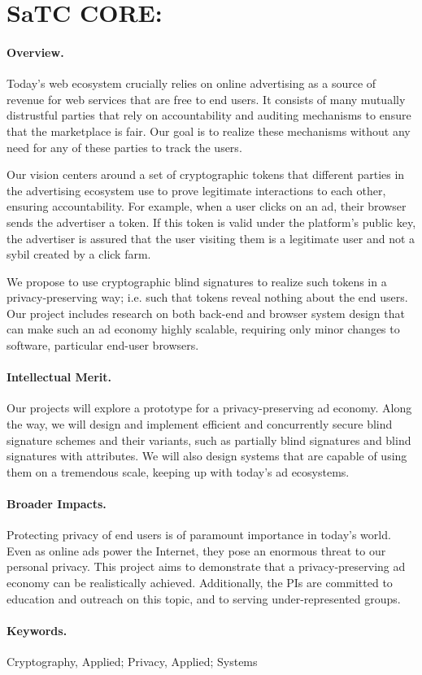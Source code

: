 \section*{SaTC CORE: \proptitle{}}
\label{sec:summary}

\paragraph{Overview.}
%
Today’s web ecosystem crucially relies on online advertising as a source of revenue for web services that are free to end users.  It consists of many mutually distrustful parties that rely on accountability and auditing mechanisms to ensure that the marketplace is fair.  Our goal is to realize these mechanisms without any need for any of these parties to track the users. 

Our vision centers around a set of cryptographic tokens that different parties in the advertising ecosystem use to prove legitimate interactions to each other, ensuring accountability.  For example, when a user clicks on an ad, their browser sends the advertiser a token. If this token is valid under the platform’s public key, the advertiser is assured that the user visiting them is a legitimate user and not a sybil created by a click farm.  

We propose to use cryptographic blind signatures to realize such tokens in a privacy-preserving way; i.e. such that tokens reveal nothing about the end users.  Our project includes research on both back-end and browser system design that can make such an ad economy highly scalable, requiring only minor changes to software, particular end-user browsers. 

\paragraph{Intellectual Merit.} Our projects will explore a prototype for a privacy-preserving ad economy.  Along the way, we will design and implement efficient and concurrently secure blind signature schemes and their variants, such as partially blind signatures and blind signatures with attributes. We will also design systems that are capable of using them on a tremendous scale, keeping up with today's ad ecosystems. 

\paragraph{Broader Impacts.} Protecting privacy of end users is of paramount importance in today's world.  Even as online ads power the Internet, they pose an enormous threat to our personal privacy.  This project aims to demonstrate that a privacy-preserving ad economy can be realistically achieved.  Additionally, the PIs are committed to education and outreach on this topic, and to serving under-represented groups.


\paragraph{Keywords.} Cryptography, Applied; Privacy, Applied; Systems

